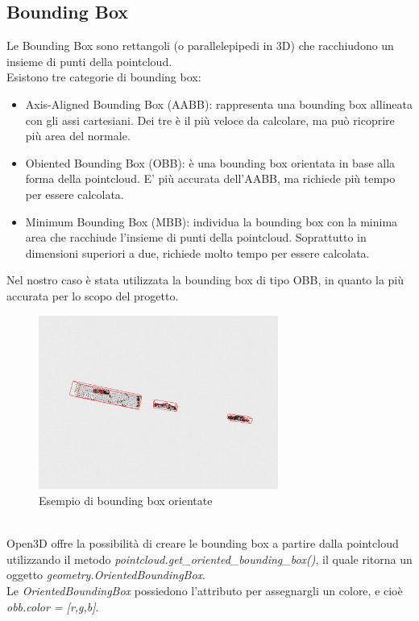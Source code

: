 \documentclass[italian]{report}
\begin{document}
\subsection{Bounding Box}
Le Bounding Box sono rettangoli (o parallelepipedi in 3D) che racchiudono un insieme di punti della pointcloud.\\
Esistono tre categorie di bounding box:
\begin{itemize}
	\item Axis-Aligned Bounding Box (AABB): rappresenta una bounding box allineata con gli assi cartesiani. Dei tre è il più veloce da calcolare, ma può ricoprire più area del normale.
	\item Obiented Bounding Box (OBB): è una bounding box orientata in base alla forma della pointcloud. E' più accurata dell'AABB, ma richiede più tempo per essere calcolata.
	\item Minimum Bounding Box (MBB): individua la bounding box con la minima area che racchiude l'insieme di punti della pointcloud. Soprattutto in dimensioni superiori a due, richiede molto tempo per essere calcolata.
\end{itemize}
Nel nostro caso è stata utilizzata la bounding box di tipo OBB, in quanto la più accurata per lo scopo del progetto.
\begin{figure}[H]
	\centering
	\includegraphics[width=0.7\textwidth]{bbox}
	\footnotesize
	\caption{Esempio di bounding box orientate}
\end{figure}\\
Open3D offre la possibilità di creare le bounding box a partire dalla pointcloud utilizzando il metodo \textit{pointcloud.get\_oriented\_bounding\_box()}, il quale ritorna un oggetto
\textit{geometry.OrientedBoundingBox}.\\
Le \textit{OrientedBoundingBox} possiedono l'attributo per assegnargli un colore, e cioè \textit{obb.color = [r,g,b]}.
\end{document}

